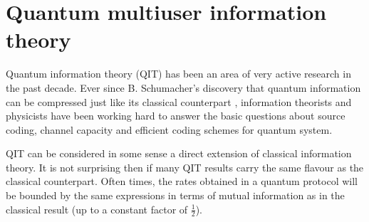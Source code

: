 \documentclass[aps,11pt,twoside,letterpaper]{article}
\begin{document}




\section{Quantum multiuser information theory}      \label{section:quantum}

	Quantum information theory (QIT) has been an area of very active research in the past decade.
	Ever since B. Schumacher's discovery that quantum information can be compressed 
	just like its classical counterpart \cite{Sc95},
	information theorists and physicists have been working hard to answer the basic questions
	about source coding, channel capacity and efficient coding schemes for quantum system.
	
	QIT can be considered in some sense a direct extension of classical information theory.
	It is not surprising then if many QIT results carry the same flavour as the classical counterpart.
	Often times, the rates obtained in a quantum protocol will be bounded by the same expressions 
	in terms of mutual information as in the classical result (up to a constant factor of $\frac{1}{2}$).
	
\end{document}
